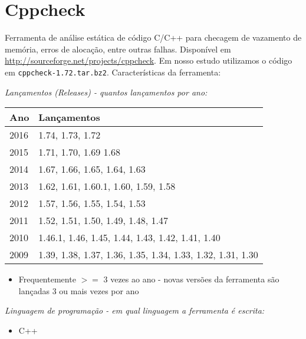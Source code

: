 \section{Cppcheck}

Ferramenta de análise estática de código C/C++ para checagem de vazamento de
memória, erros de alocação, entre outras falhas. Disponível em
\url{http://sourceforge.net/projects/cppcheck}. Em nosso estudo utilizamos o
código em \texttt{cppcheck-1.72.tar.bz2}. Características da ferramenta:

\begin{description}

  \item {\it Lançamentos ({\it Releases}) - quantos lançamentos por ano:}
    \begin{table}[h!]
      \centering
      \begin{tabular}{| l | l |}
        \hline
        Ano  & Lançamentos                                                \\
        \hline
        2016 & 1.74, 1.73, 1.72                                           \\
        2015 & 1.71, 1.70, 1.69 1.68                                      \\
        2014 & 1.67, 1.66, 1.65, 1.64, 1.63                               \\
        2013 & 1.62, 1.61, 1.60.1, 1.60, 1.59, 1.58                       \\
        2012 & 1.57, 1.56, 1.55, 1.54, 1.53                               \\
        2011 & 1.52, 1.51, 1.50, 1.49, 1.48, 1.47                         \\
        2010 & 1.46.1, 1.46, 1.45, 1.44, 1.43, 1.42, 1.41, 1.40           \\
        2009 & 1.39, 1.38, 1.37, 1.36, 1.35, 1.34, 1.33, 1.32, 1.31, 1.30 \\
        \hline
      \end{tabular}
    \end{table}
    \begin{itemize}
      \item Frequentemente $>=$ 3 vezes ao ano - novas versões da ferramenta são lançadas 3 ou mais vezes por ano
    \end{itemize}

  \item {\it Linguagem de programação - em qual linguagem a ferramenta é escrita:}
    \begin{itemize}
      \item C++
    \end{itemize}

\end{description}


